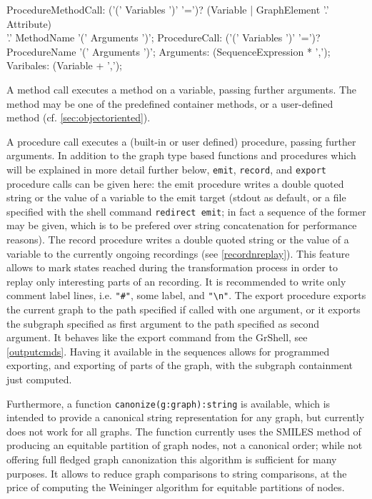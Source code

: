 \begin{rail} 
	ProcedureMethodCall: ('(' Variables ')' '=')? (Variable | GraphElement '.' Attribute) \\ '.' MethodName '(' Arguments ')';
	ProcedureCall: ('(' Variables ')' '=')? ProcedureName '(' Arguments ')';
	Arguments: (SequenceExpression * ',');
	Varibales: (Variable + ',');
\end{rail}\label{recstmt}

A method call executes a method on a variable, passing further arguments.
The method may be one of the predefined container methods, or a user-defined method (cf. \ref{sec:objectoriented}).

A procedure call executes a (built-in or user defined) procedure, passing further arguments.
In addition to the graph type based functions and procedures which will be explained in more detail further below,
\texttt{emit}, \texttt{record}, and \texttt{export} procedure calls can be given here: the emit procedure writes a double quoted string or the value of a variable to the emit target (stdout as default, or a file specified with the shell command \texttt{redirect emit}; in fact a sequence of the former may be given, which is to be prefered over string concatenation for performance reasons).
The record procedure writes a double quoted string or the value of a variable to the currently ongoing recordings (see \ref{recordnreplay}). This feature allows to mark states reached during the transformation process in order to replay only interesting parts of an recording. It is recommended to write only comment label lines, i.e. \verb/"#"/, some label, and \verb/"\n"/.
The export procedure exports the current graph to the path specified if called with one argument, or it exports the subgraph specified as first argument to the path specified as second argument.
It behaves like the export command from the GrShell, see \ref{outputcmds}.
Having it available in the sequences allows for programmed exporting, and exporting of parts of the graph, with the subgraph containment just computed.

Furthermore, a function \texttt{canonize(g:graph):string} is available,
which is intended to provide a canonical string representation for any graph, but currently does not work for all graphs.
The function currently uses the SMILES\cite{SMILES} method of producing an equitable partition of graph nodes, not a canonical order; while not offering full fledged graph canonization this algorithm is sufficient for many purposes. 
It allows to reduce graph comparisons to string comparisons, at the price of computing the Weininger algorithm for equitable partitions of nodes.

